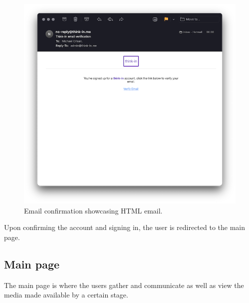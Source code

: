 \begin{figure}[H]
	\includegraphics[width=\textwidth,keepaspectratio]{images/business_logic/sign_up_email_confirmation.png}
	\caption{Email confirmation showcasing HTML email.}
	\label{figure:email-confirmation}
\end{figure}

Upon confirming the account and signing in, the user is redirected to the main page.

\subsection{Main page}

The main page is where the users gather and communicate as well as view the media made available by a certain stage.

